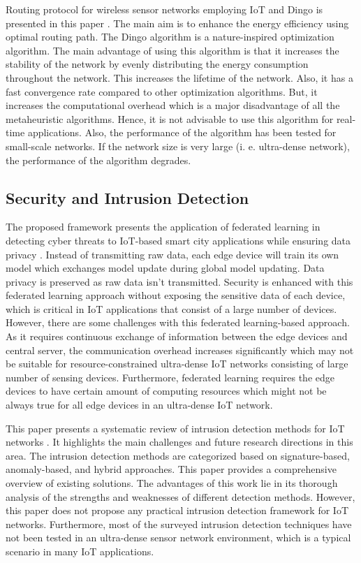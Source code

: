 \documentclass[a4paper,fleqn]{cas-dc}
\numberwithin{equation}{section}
\begin{document}
Routing protocol for wireless sensor networks employing IoT and Dingo is presented in this paper \cite{KishoreKumar2023}. The main aim is to enhance the energy efficiency using optimal routing path. The Dingo algorithm is a nature-inspired optimization algorithm. The main advantage of using this algorithm is that it increases the stability of the network by evenly distributing the energy consumption throughout the network. This increases the lifetime of the network. Also, it has a fast convergence rate compared to other optimization algorithms. But, it increases the computational overhead which is a major disadvantage of all the metaheuristic algorithms. Hence, it is not advisable to use this algorithm for real-time applications. Also, the performance of the algorithm has been tested for small-scale networks. If the network size is very large (i. e. ultra-dense network), the performance of the algorithm degrades.

\subsection{Security and Intrusion Detection}

The proposed framework presents the application of federated learning in detecting cyber threats to IoT-based smart city applications while ensuring data privacy \cite{Ragab2025}. Instead of transmitting raw data, each edge device will train its own model which exchanges model update during global model updating. Data privacy is preserved as raw data isn't transmitted. Security is enhanced with this federated learning approach without exposing the sensitive data of each device, which is critical in IoT applications that consist of a large number of devices. However, there are some challenges with this federated learning-based approach. As it requires continuous exchange of information between the edge devices and central server, the communication overhead increases significantly which may not be suitable for resource-constrained ultra-dense IoT networks consisting of large number of sensing devices. Furthermore, federated learning requires the edge devices to have certain amount of computing resources which might not be always true for all edge devices in an ultra-dense IoT network.

This paper presents a systematic review of intrusion detection methods for IoT networks \cite{Arnob202573}. It highlights the main challenges and future research directions in this area. The intrusion detection methods are categorized based on signature-based, anomaly-based, and hybrid approaches. This paper provides a comprehensive overview of existing solutions. The advantages of this work lie in its thorough analysis of the strengths and weaknesses of different detection methods. However, this paper does not propose any practical intrusion detection framework for IoT networks. Furthermore, most of the surveyed intrusion detection techniques have not been tested in an ultra-dense sensor network environment, which is a typical scenario in many IoT applications.
\end{document}
